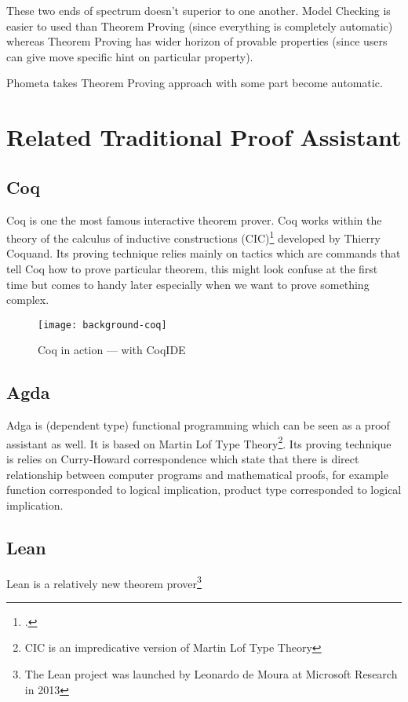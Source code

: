 These two ends of spectrum doesn't superior to one another. Model Checking is easier to used than Theorem Proving (since everything is completely automatic) whereas Theorem Proving has wider horizon of provable properties (since users can give move specific hint on particular property).

Phometa takes Theorem Proving approach with some part become automatic.

\section{Related Traditional Proof Assistant}

\subsection{Coq}
Coq\supercite{coq-official-website} is one the most famous interactive theorem prover. Coq works within the theory of the calculus of inductive constructions (CIC)\footcite{CIC is itself is developed alongside Coq.} developed by Thierry Coquand\supercite{thierry-coquand-homepage}. Its proving technique relies mainly on tactics which are commands that tell Coq how to prove particular theorem, this might look confuse at the first time but comes to handy later especially when we want to prove something complex.

\begin{figure}[H]
    \centering
    \texttt{[image: background-coq]}
    \caption{Coq in action --- with CoqIDE \supercite{coq-official-website}}
\label{fig:background-coq}
\end{figure}

\subsection{Agda}
Adga\supercite{agda-official-website} is (dependent type) functional programming which can be seen as a proof assistant as well. It is based on Martin Lof Type Theory\footnote{CIC is an impredicative version of Martin Lof Type Theory}. Its proving technique is relies on Curry-Howard correspondence which state that there is direct relationship between computer programs and mathematical proofs\supercite{curry-howard-correspondence}, for example function corresponded to logical implication, product type corresponded to logical implication.

\subsection{Lean}
Lean\supercite{lean-offical-website} is a relatively new theorem prover\footnote{The Lean project was launched by Leonardo de Moura at Microsoft Research in 2013}

